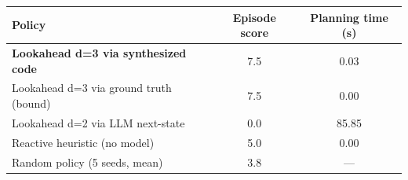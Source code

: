 \begin{tabular}{lcc}
\toprule
Policy & Episode score & Planning time (s) \\
\midrule
\textbf{Lookahead d=3 via synthesized code} & 7.5 & 0.03 \\
Lookahead d=3 via ground truth (bound) & 7.5 & 0.00 \\
Lookahead d=2 via LLM next-state & 0.0 & 85.85 \\
Reactive heuristic (no model) & 5.0 & 0.00 \\
Random policy (5 seeds, mean) & 3.8 & --- \\
\bottomrule
\end{tabular}
